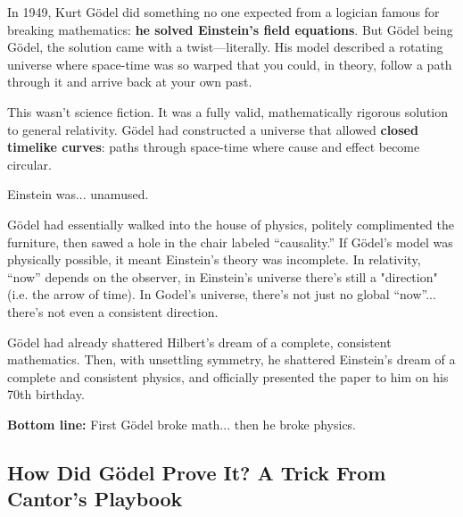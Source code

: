 \begin{tcolorbox}[colback=blue!5!white, colframe=blue!50!black,
  title={Historical Sidebar: Gödel’s Time-Twisting Universe}]
  
  In 1949, Kurt Gödel did something no one expected from a logician famous for breaking mathematics:  
  \textbf{he solved Einstein’s field equations}. But Gödel being Gödel, the solution came with a twist—literally. His model described a rotating universe where space-time was so warped that you could, in theory, follow a path through it and arrive back at your own past.
  
  \medskip
  
  This wasn’t science fiction. It was a fully valid, mathematically rigorous solution to general relativity. Gödel had constructed a universe that allowed \textbf{closed timelike curves}: paths through space-time where cause and effect become circular.
  
  \medskip
  
  Einstein was... unamused.

  \medskip
  
  Gödel had essentially walked into the house of physics, politely complimented the furniture, then sawed a hole in the chair labeled ``causality.'' If Gödel’s model was physically possible, it meant Einstein's theory was incomplete.  In relativity, ``now'' depends on the observer, in Einstein's universe there's still a "direction" (i.e. the arrow of time). In Godel's universe, there’s not just no global “now”... there’s not even a consistent direction.
  
  \medskip

  Gödel had already shattered Hilbert’s dream of a complete, consistent mathematics. Then, with unsettling symmetry, he shattered Einstein's dream of a complete and consistent physics, and officially presented the paper to him on his 70th birthday.

  \medskip

  \textbf{Bottom line:} First Gödel broke math... then he broke physics.

  
\end{tcolorbox}

\vspace{1em}

\subsection{How Did Gödel Prove It? A Trick From Cantor’s Playbook}


